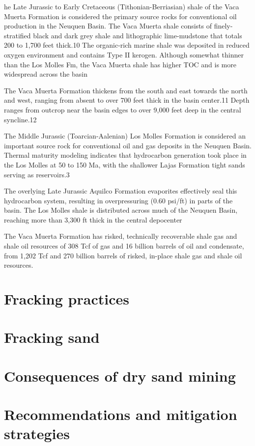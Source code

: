 he Late Jurassic to Early Cretaceous (Tithonian-Berriasian) shale
of the Vaca Muerta Formation is considered the primary source rocks for conventional oil
production in the Neuquen Basin. The Vaca Muerta shale consists of finely-stratified black and
dark grey shale and lithographic lime-mudstone that totals 200 to 1,700 feet thick.10 The
organic-rich marine shale was deposited in reduced oxygen environment and contains Type II
kerogen. Although somewhat thinner than the Los Molles Fm, the Vaca Muerta shale has
higher TOC and is more widespread across the basin

The Vaca Muerta Formation thickens from the south and east towards the north and
west, ranging from absent to over 700 feet thick in the basin center.11 Depth ranges from
outcrop near the basin edges to over 9,000 feet deep in the central syncline.12

The Middle Jurassic (Toarcian-Aalenian) Los Molles Formation is
considered an important source rock for conventional oil and gas deposits in the Neuquen
Basin. Thermal maturity modeling indicates that hydrocarbon generation took place in the Los
Molles at 50 to 150 Ma, with the shallower Lajas Formation tight sands serving as reservoirs.3

The overlying Late Jurassic Aquilco Formation evaporites effectively seal this hydrocarbon
system, resulting in overpressuring (0.60 psi/ft) in parts of the basin.
The Los Molles shale is distributed across much of the Neuquen Basin, reaching more
than 3,300 ft thick in the central depocenter



The Vaca Muerta Formation has risked, technically recoverable shale gas and shale oil
resources of 308 Tcf of gas and 16 billion barrels of oil and condensate, from 1,202 Tcf and 270
billion barrels of risked, in-place shale gas and shale oil resources.

\section{Fracking practices}

\section{Fracking sand}




\section{Consequences of dry sand mining}

\section{Recommendations and mitigation strategies}